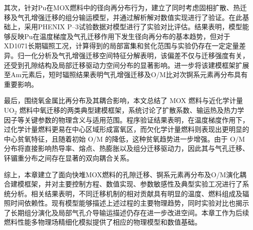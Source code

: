 其次，针对Pu在MOX燃料中的径向再分布行为，建立了同时考虑固相扩散、热迁移及气孔增强迁移的组分输运模型，并通过解析解对数值实现进行了验证。在此基础上，采用PHENIX P--3试验数据对模型进行了实验对比评估。结果表明，模型能够反映Pu在温度梯度及气孔迁移作用下发生径向再分布的基本趋势，但对于XD1071长期辐照工况，计算得到的局部富集和贫化范围与实验仍存在一定定量差异。归一化分析及气孔增强迁移空间特征分解表明，该偏差不仅与迁移强度有关，还受到孔隙结构及局部迁移驱动力空间分布的显著影响。进一步将该建模框架扩展至Am元素后，短时辐照结果表明气孔增强迁移及O/M比对次锕系元素再分布具有重要影响。

最后，围绕氧金属比再分布及其耦合影响，本文总结了 MOX 燃料与近化学计量 UO$_2$ 燃料中氧迁移的两类典型建模框架，系统讨论了扩散系数、输运热及热力学因子等关键参数的物理含义与适用范围。程序验证结果表明，在温度梯度作用下，过化学计量燃料更易在中心区域形成富氧区，而欠化学计量燃料则表现出更明显的中心贫氧特征，且随着初始 O/M 的降低，这种贫氧趋势进一步增强。由于 O/M 分布将直接影响热导率、熔点、热膨胀以及组分迁移驱动力，因此其与气孔迁移、钚镅重分布之间存在显著的双向耦合关系。

综上，本章建立了面向快堆MOX燃料的孔隙迁移、锕系元素再分布及O/M演化耦合建模框架，并对主要控制方程、数值实现、参数敏感性及典型实验工况进行了系统分析。相关结果表明，不同迁移机制的相对贡献具有明显的温度、燃料组成及辐照时间依赖性。现有模型能够描述上述过程的主要物理趋势，同时实验对比也揭示了长期组分演化及局部气孔介导输运描述仍存在进一步改进空间。本章工作为后续燃料性能多物理场精细化模拟提供了相应的物理模型和数值基础。